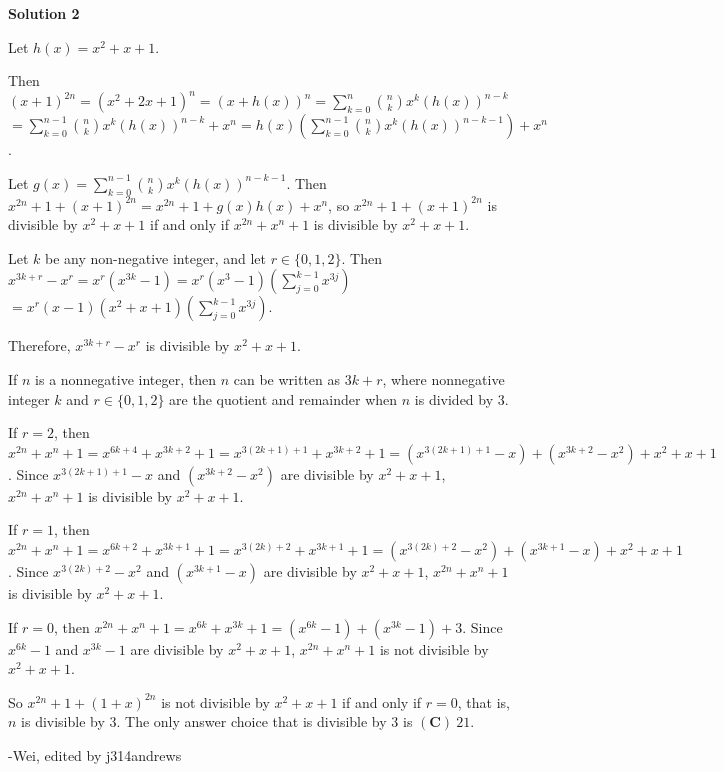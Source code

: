 \begin{enumerate}
 



\textbf{Solution 2}

Let $h(x)=x^2+x+1$.

 Then $(x+1)^{2n} = (x^2+2x+1)^n = (x+h(x))^n = \sum_{k=0}^{n} \binom{n}{k} x^k (h(x))^{n-k}$ $= \sum_{k=0}^{n-1} \binom{n}{k} x^k (h(x))^{n-k} + x^n = h(x) \left(\sum_{k=0}^{n-1} \binom{n}{k} x^k (h(x))^{n-k-1}\right) + x^n$.

 Let $g(x) = \sum_{k=0}^{n-1} \binom{n}{k} x^k (h(x))^{n-k-1}$.  Then $x^{2n} + 1 + (x+1)^{2n} = x^{2n} + 1 + g(x)h(x) + x^n$, so $x^{2n} + 1 + (x+1)^{2n}$ is divisible by $x^2 + x + 1$ if and only if $x^{2n} +  x^n + 1$ is divisible by $x^2 + x + 1$.

 Let $k$ be any non-negative integer, and let $r \in \{0, 1, 2\}$.  Then $x^{3k+r} - x^r = x^r(x^{3k} - 1) = x^r(x^3 - 1)\left(\sum_{j=0}^{k - 1} x^{3j}\right)$$= x^r(x-1)(x^2 + x + 1)\left(\sum_{j=0}^{k - 1} x^{3j}\right)$.

 Therefore, $x^{3k+r} - x^r$ is divisible by $x^2 + x + 1$.

 If $n$ is a nonnegative integer, then $n$ can be written as $3k + r$, where nonnegative integer $k$ and $r \in \{0, 1, 2\}$ are the quotient and remainder when $n$ is divided by $3$.  

 If $r = 2$, then $x^{2n} + x^n + 1 = x^{6k+4} + x^{3k+2} + 1 = x^{3(2k+1)+1} + x^{3k+2} + 1 = (x^{3(2k+1)+1} - x) + (x^{3k+2} - x^2) + x^2 + x + 1$.  Since $x^{3(2k+1)+1} - x$ and $(x^{3k+2} - x^2)$ are divisible by $x^2 + x + 1$, $x^{2n} + x^n + 1$ is divisible by $x^2 + x + 1$.  

 If $r = 1$, then $x^{2n} + x^n + 1 = x^{6k+2} + x^{3k+1} + 1 = x^{3(2k)+2} + x^{3k+1} + 1 = (x^{3(2k)+2} - x^2) + (x^{3k+1} - x) + x^2 + x + 1$.  Since $x^{3(2k)+2} - x^2$ and $(x^{3k+1} - x)$ are divisible by $x^2 + x + 1$, $x^{2n} + x^n + 1$ is divisible by $x^2 + x + 1$. 

 If $r = 0$, then $x^{2n} + x^n + 1 = x^{6k} + x^{3k} + 1 = (x^{6k} - 1) + (x^{3k} - 1) + 3$.  Since $x^{6k} - 1$ and $x^{3k} - 1$ are divisible by $x^2 + x + 1$, $x^{2n} + x^n + 1$ is not divisible by $x^2 + x + 1$.

 So $x^{2n} + 1 + (1+x)^{2n}$ is not divisible by $x^2 + x + 1$ if and only if $r = 0$, that is, $n$ is divisible by $3$.  The only answer choice that is divisible by $3$ is $\boxed{(\textbf{C})\ 21}$.

 -Wei, edited by j314andrews

 




\end{enumerate}
